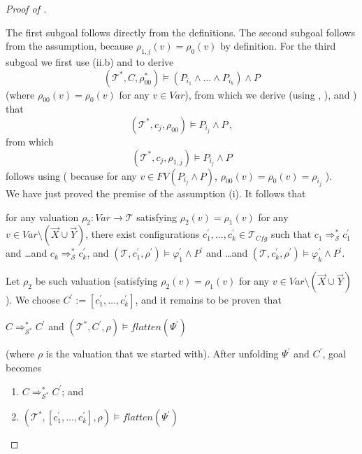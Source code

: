 \documentclass{article}
\newcommand{\Tcfg}{\mathcal{T}_{\mathit{Cfg}}}
\newenvironment{proofenv}
  {
    \VerbatimEnvironment\begin{tcolorbox}[colback=black!0!white] %
  }
  {
   \end{tcolorbox}
  }
\begin{document}
\begin{proof}[Proof of ]
\begin{enumerate}
\begin{proofenv}
    \end{proofenv}
    The first subgoal follows directly from the definitions.
    The second subgoal follows from the assumption, because $\rho_{1,j}(v) = \rho_0(v)$ by definition.
    For the third subgoal we first use (ii.b) and  to derive
    \begin{equation*}
        (\mathcal{T}^*, C, \rho_{00}^*) \vDash (P_{i_1} \land \ldots \land P_{i_k}) \land P
    \end{equation*}
    (where $\rho_{00}(v) = \rho_0(v)$ for any $v \in \mathit{Var}$),
    from which we derive (using , ),
    and ) that
    \begin{equation*}
        (\mathcal{T}^*, c_j, \rho_{00}) \vDash P_{i_j} \land P \, ,
    \end{equation*}
    from which
    \begin{equation*}
        (\mathcal{T}^*, c_j, \rho_{1,j}) \vDash P_{i_j} \land P
    \end{equation*}
    follows using 
    (
    because for any $v \in \mathit{FV}(P_{i_j} \land P)$, 
    $\rho_{00}(v) = \rho_0(v) = \rho_{i_j}$
    ).
    \\
    We have just proved the premise of the assumption (i).
    It follows that
    \begin{proofenv}
        for any valuation $\rho_2 : \mathit{Var} \to \mathcal{T}$
        satisfying $\rho_2(v) = \rho_1(v)$ for any $v \in \mathit{Var} \setminus (\vec{X} \cup \vec{Y})$,
        there exist configurations $c_1^\prime,\ldots,c_k^\prime \in \Tcfg$ such that
        $c_1 \Rightarrow^*_{\mathcal{S}} c_1^\prime$ and \ldots and
        $c_k \Rightarrow^*_{\mathcal{S}} c_k^\prime$,
        and $(\mathcal{T}, c_1^\prime,\rho^\prime) \vDash \varphi_1^\prime \land P^\prime$ and \ldots and $(\mathcal{T}, c_k^\prime, \rho^\prime) \vDash \varphi_k^\prime \land P^\prime$.
    \end{proofenv}
    Let $\rho_2$ be such valuation (satisfying $\rho_2(v) = \rho_1(v)$ for any $v \in \mathit{Var} \setminus (\vec{X} \cup \vec{Y})$).
    We choose $C^\prime := [ c_1^\prime,\ldots,c_k^\prime ]$,
    and it remains to be proven that
    \begin{proofenv}
        $C \Rightarrow^*_{\mathcal{S}^*} C^\prime$ and $(\mathcal{T}^*, C^\prime, \rho) \vDash \mathit{flatten}(\Psi^\prime)$ \,
    \end{proofenv}
    (where $\rho$ is the valuation that we started with).
    After unfolding $\Psi^\prime$ and $C^\prime$, goal becomes
    \begin{proofenv}
        \begin{enumerate}
            \item $C \Rightarrow^*_{\mathcal{S}^*} C^\prime$; and
            \item $(\mathcal{T}^*, [ c_1^\prime,\ldots,c_k^\prime ], \rho) \vDash \mathit{flatten}(\Psi^\prime)$
        \end{enumerate}
    \end{proofenv}
    

\end{enumerate}
\end{proof}
\end{document}
